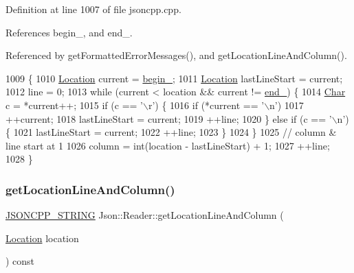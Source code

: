 Definition at line 1007 of file jsoncpp.\+cpp.



References begin\+\_\+, and end\+\_\+.



Referenced by get\+Formatted\+Error\+Messages(), and get\+Location\+Line\+And\+Column().


\begin{DoxyCode}
1009                                                          \{
1010   \hyperlink{class_json_1_1_reader_a46795b5b272bf79a7730e406cb96375a}{Location} current = \hyperlink{class_json_1_1_reader_a327166839022ea91f0a8290960a8af76}{begin\_};
1011   \hyperlink{class_json_1_1_reader_a46795b5b272bf79a7730e406cb96375a}{Location} lastLineStart = current;
1012   line = 0;
1013   \textcolor{keywordflow}{while} (current < location && current != \hyperlink{class_json_1_1_reader_a714793579cbf4ee7c5a7223d2c8d77c1}{end\_}) \{
1014     \hyperlink{class_json_1_1_reader_a3eec9118f3e9a672ba8348c3a79d0f45}{Char} c = *current++;
1015     \textcolor{keywordflow}{if} (c == \textcolor{charliteral}{'\(\backslash\)r'}) \{
1016       \textcolor{keywordflow}{if} (*current == \textcolor{charliteral}{'\(\backslash\)n'})
1017         ++current;
1018       lastLineStart = current;
1019       ++line;
1020     \} \textcolor{keywordflow}{else} \textcolor{keywordflow}{if} (c == \textcolor{charliteral}{'\(\backslash\)n'}) \{
1021       lastLineStart = current;
1022       ++line;
1023     \}
1024   \}
1025   \textcolor{comment}{// column & line start at 1}
1026   column = int(location - lastLineStart) + 1;
1027   ++line;
1028 \}
\end{DoxyCode}
\mbox{\label{class_json_1_1_reader_a49757dec5a1a53eff388dc7bf2bda890}} 
\subsubsection{\texorpdfstring{get\+Location\+Line\+And\+Column()}{getLocationLineAndColumn()}\hspace{0.1cm}{\footnotesize\ttfamily [2/2]}}
{\footnotesize\ttfamily \hyperlink{json_8h_a1e723f95759de062585bc4a8fd3fa4be}{J\+S\+O\+N\+C\+P\+P\+\_\+\+S\+T\+R\+I\+NG} Json\+::\+Reader\+::get\+Location\+Line\+And\+Column (\begin{DoxyParamCaption}\item[{\hyperlink{class_json_1_1_reader_a46795b5b272bf79a7730e406cb96375a}{Location}}]{location }\end{DoxyParamCaption}) const\hspace{0.3cm}{\ttfamily [private]}}



